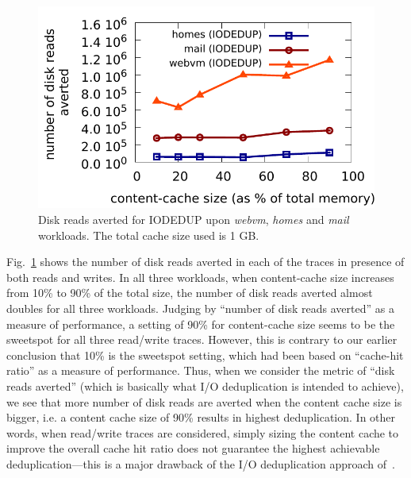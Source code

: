 \begin{figure}
    \centering
    \includegraphics[scale=0.65]{confided-figures/sweetspot/reads-writes/sweetspotaverted-reads-n-writes.pdf}
\caption{Disk reads averted for IODEDUP upon \textit{webvm}, \textit{homes} and \textit{mail} workloads. The total cache size used is 1 GB.}
\label{fig:sweetspot-averted}
\end{figure}

Fig.~\ref{fig:sweetspot-averted} shows the number of disk reads averted
in each of the traces in presence of both reads and writes.
In all three workloads, when content-cache size increases from 10\% to
90\% of the total size, the number of disk reads averted almost doubles
for all three workloads.
Judging by ``number of disk reads averted'' as a measure of performance,
a setting of 90\% for content-cache size seems to be the sweetspot
for all three read/write traces. However, this is contrary to our earlier
conclusion that 10\% is the sweetspot setting, which had been based
on ``cache-hit ratio'' as a measure of performance.
Thus, when we consider the metric of “disk reads averted” (which is 
basically what I/O deduplication is intended to achieve), we see that 
more number of disk reads are averted when the content cache size is 
bigger, i.e. a content cache size of 90\% results in highest deduplication. 
In other words, when read/write traces are considered, simply sizing the 
content cache to improve the overall cache hit ratio does not guarantee the 
highest achievable deduplication---this is a major drawback of the 
I/O deduplication approach of~\cite{iodedup}.


